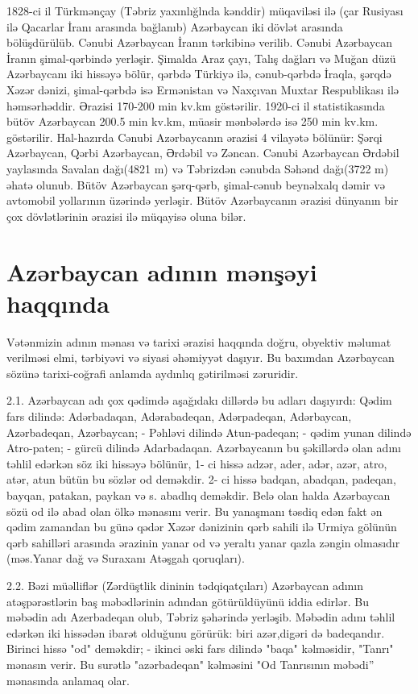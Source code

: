 \documentclass[a4paper,14pt]{article}
\begin{document}
1828-ci il Türkmənçay (Təbriz yaxınlığlnda kənddir) müqaviləsi ilə (çar Rusiyası ilə Qacarlar İranı arasında bağlanıb) Azərbaycan iki dövlət arasında bölüşdürülüb. Cənubi Azərbaycan İranın tərkibinə verilib. Cənubi Azərbaycan İranın şimal-qərbində yerləşir. Şimalda Araz çayı, Talış dağları və Muğan düzü Azərbaycanı iki hissəyə bölür, qərbdə Türkiyə ilə, cənub-qərbdə İraqla, şərqdə Xəzər dənizi, şimal-qərbdə isə Ermənistan və Naxçıvan Muxtar Respublikası ilə həmsərhəddir. Ərazisi 170-200 min kv.km göstərilir. 1920-ci il statistikasında bütöv Azərbaycan 200.5 min kv.km, müasir mənbələrdə isə 250 min kv.km. göstərilir. Hal-hazırda Cənubi Azərbaycanın ərazisi 4 vilayətə bölünür: Şərqi Azərbaycan, Qərbi Azərbaycan, Ərdəbil və Zəncan. Cənubi Azərbaycan Ərdəbil yaylasında Savalan dağı(4821 m) və Təbrizdən cənubda Səhənd dağı(3722 m) əhatə olunub. Bütöv Azərbaycan şərq-qərb, şimal-cənub beynəlxalq dəmir və avtomobil yollarının üzərində yerləşir. Bütöv Azərbaycanın ərazisi dünyanın bir çox dövlətlərinin ərazisi ilə müqayisə oluna bilər.

\section{Azərbaycan adının mənşəyi haqqında}
\hspace*{0.5cm} Vətənmizin adının mənası və tarixi ərazisi haqqında doğru, obyektiv məlumat verilməsi elmi, tərbiyəvi və siyasi əhəmiyyət daşıyır. Bu baxımdan Azərbaycan sözünə tarixi-coğrafi anlamda aydınlıq gətirilməsi zəruridir.

2.1. Azərbaycan adı çox qədimdə aşağıdakı dillərdə bu adları daşıyırdı:
Qədim fars dilində: Adərbadaqan, Adərabadeqan, Adərpadeqan, Adərbaycan, Azərbadeqan, Azərbaycan;
- Pəhləvi dilində Atun-padeqan;
- qədim yunan dilində Atro-paten;
- gürcü dilində Adarbadaqan.
Azərbaycanın bu şəkillərdə olan adını təhlil edərkən söz iki hissəyə bölünür,
1- ci hissə adzər, ader, adər, azər, atro, atər, atun bütün bu sözlər od deməkdir.
2- ci hissə badqan, abadqan, padeqan, bayqan, patakan, paykan və s. abadlıq deməkdir. Belə olan halda Azərbaycan sözü od ilə abad olan ölkə mənasını verir. Bu yanaşmanı təsdiq edən fakt ən qədim zamandan bu günə qədər Xəzər dənizinin qərb sahili ilə Urmiya gölünün qərb sahilləri arasında ərazinin yanar od və yeraltı yanar qazla zəngin olmasıdır (məs.Yanar dağ və Suraxanı Atəşgah qoruqları).

2.2. Bəzi müəlliflər (Zərdüştlik dininin tədqiqatçıları) Azərbaycan adının atəşpərəstlərin baş məbədlərinin adından götürüldüyünü iddia edirlər. Bu məbədin adı Azerbadeqan olub, Təbriz şəhərində yerləşib. Məbədin adını təhlil edərkən iki hissədən ibarət olduğunu görürük: biri azər,digəri də badeqandır. Birinci hissə "od" deməkdir;
- ikinci əski fars dilində "baqa" kəlməsidir, "Tanrı" mənasın verir. Bu surətlə "azərbadeqan" kəlməsini "Od Tanrısının məbədi” mənasında anlamaq olar.
\end{document}
